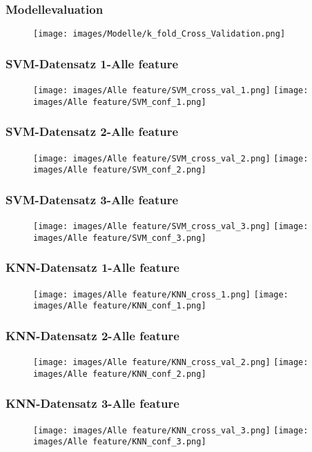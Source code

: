 \documentclass[utf8x, xcolor=dvipsnames]{beamer}
\begin{document}
\begin{frame}
\frametitle{Modellevaluation}
\begin{figure}
	\texttt{[image: images/Modelle/k\_fold\_Cross\_Validation.png]}
\end{figure}
\end{frame}

\begin{frame}
\frametitle{SVM-Datensatz 1-Alle feature}
\begin{figure}
	\texttt{[image: images/Alle feature/SVM\_cross\_val\_1.png]}
	\texttt{[image: images/Alle feature/SVM\_conf\_1.png]}
\end{figure}
\end{frame}

\begin{frame}
\frametitle{SVM-Datensatz 2-Alle feature}
\begin{figure}
	\texttt{[image: images/Alle feature/SVM\_cross\_val\_2.png]}
	\texttt{[image: images/Alle feature/SVM\_conf\_2.png]}
\end{figure}
\end{frame}

\begin{frame}
\frametitle{SVM-Datensatz 3-Alle feature}
\begin{figure}
	\texttt{[image: images/Alle feature/SVM\_cross\_val\_3.png]}
	\texttt{[image: images/Alle feature/SVM\_conf\_3.png]}
\end{figure}
\end{frame}

\begin{frame}
\frametitle{KNN-Datensatz 1-Alle feature}
\begin{figure}
	\texttt{[image: images/Alle feature/KNN\_cross\_1.png]}
	\texttt{[image: images/Alle feature/KNN\_conf\_1.png]}
\end{figure}
\end{frame}

\begin{frame}
\frametitle{KNN-Datensatz 2-Alle feature}
\begin{figure}
	\texttt{[image: images/Alle feature/KNN\_cross\_val\_2.png]}
	\texttt{[image: images/Alle feature/KNN\_conf\_2.png]}
\end{figure}
\end{frame}

\begin{frame}
\frametitle{KNN-Datensatz 3-Alle feature}
\begin{figure}
	\texttt{[image: images/Alle feature/KNN\_cross\_val\_3.png]}
	\texttt{[image: images/Alle feature/KNN\_conf\_3.png]}
\end{figure}
\end{frame}
\end{document}
